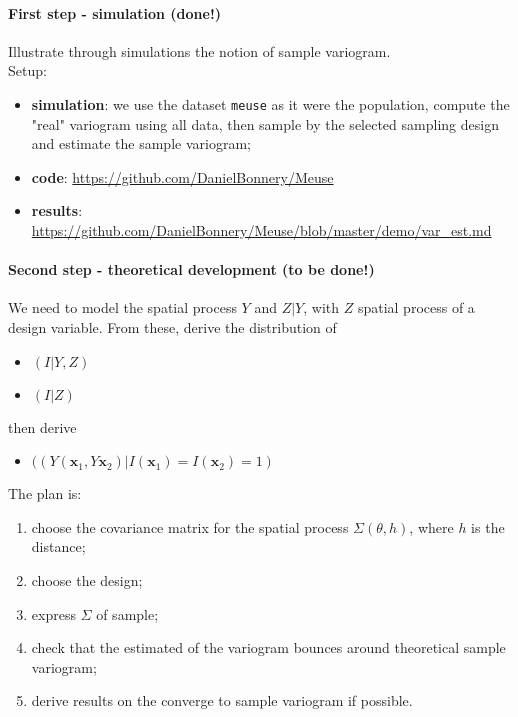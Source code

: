 \documentclass[12pt]{article}
\theoremstyle{definition}
\theoremstyle{remark}
\begin{document}
    \paragraph{First step - simulation (done!)}
Illustrate through simulations the notion of sample variogram.\\
Setup:
\begin{itemize}    

    \item \textbf{simulation}: we use the dataset \texttt{meuse} as it were the population, compute the "real" variogram using all data, then sample by the selected sampling design and estimate the sample variogram;
    \item \textbf{code}: \url{https://github.com/DanielBonnery/Meuse}
    \item \textbf{results}: \url{https://github.com/DanielBonnery/Meuse/blob/master/demo/var_est.md}
\end{itemize}
\paragraph{Second step - theoretical development (to be done!)}
We need to model the spatial process $Y$ and $Z|Y$, with $Z$ spatial process of a design variable. From these, derive the distribution of 
\begin{itemize}
    \item $(I|Y,Z)$
    \item $(I|Z)$
\end{itemize}
then derive
\begin{itemize}
    \item $((Y(\textbf{x}_{1},Y\textbf{x}_{2})|I(\textbf{x}_{1})=I(\textbf{x}_{2})=1)$
\end{itemize}

The plan is:
\begin{enumerate}
    \item choose the covariance matrix for the spatial process $\Sigma(\theta,h)$, where $h$ is the distance;
    \item choose the design;
    \item express $\Sigma$ of sample;
    \item check that the estimated of the variogram bounces around theoretical sample variogram;
    \item derive results on the converge to sample variogram if possible.
\end{enumerate}
\end{document}
